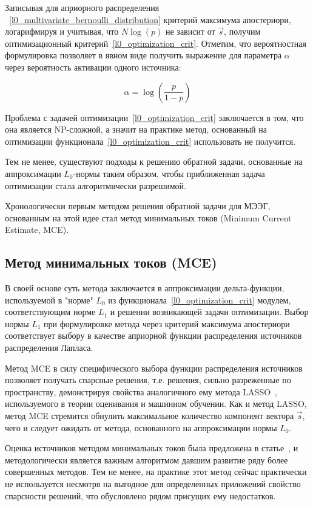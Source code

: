 Записывая для априорного распределения
~\ref{l0_multivariate_bernoulli_distribution} критерий максимума апостериори,
логарифмируя и учитывая, что $N\log(p)$ не зависит от $\vec{s}$, получим
оптимизационный критерий~\ref{l0_optimization_crit}. Отметим, что вероятностная
формулировка позволяет в явном виде получить выражение для параметра $\alpha$
через вероятность активации одного источника:

\begin{equation}
    \alpha = \log\left(\frac{p}{1-p}\right)
\end{equation}


Проблема с задачей оптимизации~\ref{l0_optimization_crit} заключается в том,
что она является NP-сложной, а значит на практике метод, основанный на
оптимизации функционала~\ref{l0_optimization_crit} использовать не получится.

Тем не менее, существуют подходы к решению обратной задачи,
основанные на аппроксимации $L_0$-нормы таким образом, чтобы
приближенная задача оптимизации стала алгоритмически разрешимой.

Хронологически первым методом решения обратной задачи для МЭЭГ,
основанным на этой идее стал метод минимальных токов
(Minimum Current Estimate, MCE).

\subsection{Метод минимальных токов (MCE)}

В своей основе суть метода заключается в аппроксимации дельта-функции,
используемой в "норме" $L_0$ из функционала~\ref{l0_optimization_crit} модулем,
соответствующим норме $L_1$ и решении возникающей задачи оптимизации. Выбор
нормы $L_1$ при формулировке метода через критерий максимума апостериори
соответствует выбору в качестве априорной функции распределения источников
распределения Лапласа.


Метод MCE в силу специфического выбора функции распределения источников
позволяет получать спарсные решения, т.е. решения, сильно разреженные по
пространству, демонстрируя свойства аналогичного ему метода
LASSO~\cite{lasso_paper}, используемого в теории оценивания и машинном обучении.
Как и метод LASSO, метод MCE стремится обнулить максимальное количество
компонент вектора $\vec{s}$, чего и следует ожидать от метода, основанного
на аппроксимации нормы $L_0$.

Оценка источников методом минимальных токов была
предложена в статье~\cite{Uutela_MCE}, и методологически является важным алгоритмом
давшим развитие ряду более совершенных методов. Тем не менее, на практике этот
метод сейчас практически не используется несмотря на выгодное для определенных
приложений свойство спарсности решений, что обусловлено рядом присущих ему
недостатков.

